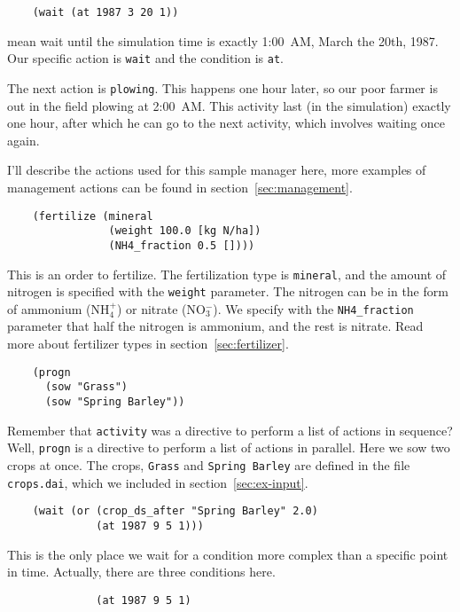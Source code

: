 \documentclass[a4paper,11pt]{article}
\begin{document}
\begin{verbatim}
    (wait (at 1987 3 20 1))
\end{verbatim}

mean wait until the simulation time is exactly 1:00~AM, March the
20th, 1987.  Our specific action is \texttt{wait} and the condition is
\texttt{at}.

The next action is \texttt{plowing}.  This happens one hour later, so
our poor farmer is out in the field plowing at 2:00~AM\@.  This activity
last (in the simulation) exactly one hour, after which he can go to
the next activity, which involves waiting once again.

I'll describe the actions used for this sample manager here, more
examples of management actions can be found in
section~\ref{sec:management}.

\begin{verbatim}
    (fertilize (mineral
                (weight 100.0 [kg N/ha])
                (NH4_fraction 0.5 [])))
\end{verbatim}

This is an order to fertilize.  The fertilization type is
\texttt{mineral}, and the amount of nitrogen is specified with the
\texttt{weight} parameter.  The nitrogen can be in the form of
ammonium (NH$_4^+$) or nitrate (NO$_3^-$).  We specify with the
\texttt{NH4\_fraction } parameter that half the nitrogen is ammonium,
and the rest is nitrate.  Read more about fertilizer types in
section~\ref{sec:fertilizer}.

\begin{verbatim}
    (progn
      (sow "Grass")
      (sow "Spring Barley"))
\end{verbatim}

Remember that \texttt{activity} was a directive to perform a list of
actions in sequence?  Well, \texttt{progn} is a directive to perform a
list of actions in parallel.  Here we sow two crops at once.  The
crops, \texttt{Grass} and \texttt{Spring Barley} are defined in the
file \texttt{crops.dai}, which we included in
section~\ref{sec:ex-input}.

\begin{verbatim}
    (wait (or (crop_ds_after "Spring Barley" 2.0)
              (at 1987 9 5 1)))
\end{verbatim}

This is the only place we wait for a condition more complex than a
specific point in time.  Actually, there are three conditions here.

\begin{verbatim}
              (at 1987 9 5 1)
\end{verbatim}
\end{document}
